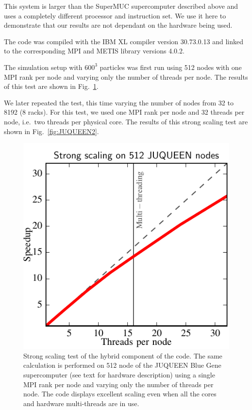 \documentclass{sig-alternate-05-2015}
\begin{document}
This system is larger than the SuperMUC supercomputer described above and
uses a completely different processor and instruction set.
We use it here to demonstrate that our results are not dependant
on the hardware being used.

The code was compiled with the IBM XL compiler version \textsc{30.73.0.13} and
linked to the corresponding MPI and METIS library
versions \textsc{4.0.2}.

The simulation setup with $600^3$ particles was first run using
512 nodes with one MPI rank per node and varying only the number of threads per
node. The results of this test are shown in Fig.~\ref{fig:JUQUEEN1}.

We later repeated the test, this time varying the number of nodes from 32 to
8192 (8 racks).  For this test, we used one MPI rank per node and 32 threads per
node, i.e.~two threads per physical core. The results of this strong scaling
test are shown in Fig.~\ref{fig:JUQUEEN2}.


\begin{figure}
\centering
\includegraphics[width=\columnwidth]{Figures/scalingInNode}
\caption{Strong scaling test of the hybrid component of the code. The
  same calculation is performed on 512 node of the JUQUEEN Blue Gene
  supercomputer (see text for hardware description) using a single MPI
  rank per node and varying only the number of
  threads per node. The code displays excellent scaling even when all the cores and
  hardware multi-threads are in use. \label{fig:JUQUEEN1}}
\end{figure}  
\end{document}
